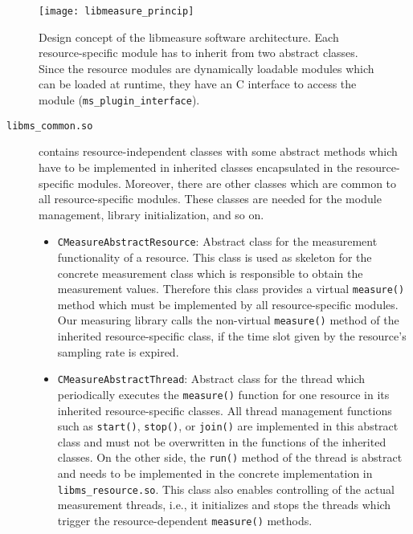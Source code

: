\begin{figure}
\begin{center}
\texttt{[image: libmeasure\_princip]} 
\caption{Design concept of the libmeasure software architecture. Each resource-specific module has to inherit from two abstract classes. Since the resource modules are dynamically loadable modules which can be loaded at runtime, they have an C interface to access the module (\texttt{ms\_plugin\_interface}).}
\label{fig:libmeasure_principle}
\end{center}
\end{figure}

\begin{description}
	
	\item[\texttt{libms\_common.so}] contains resource-independent classes with some abstract methods which have to be implemented in inherited classes encapsulated in the resource-specific modules. Moreover, there are other classes which are common to all resource-specific modules. These classes are needed for the module management, library initialization, and so on.

\pagebreak
\vspace*{-1.0cm}

	\begin{itemize}
		\item \texttt{CMeasureAbstractResource}: Abstract class for the measurement functionality of a resource. This class is used as skeleton for the concrete measurement class which is responsible to obtain the measurement values. Therefore this class provides a virtual \texttt{measure()} method which must be implemented by all resource-specific modules. Our measuring library calls the non-virtual \texttt{measure()} method of the inherited resource-specific class, if the time slot given by the resource's sampling rate is expired.
		
		\item \texttt{CMeasureAbstractThread}: Abstract class for the thread which periodically executes the \texttt{measure()} function for one resource in its inherited resource-specific classes. All thread management functions such as \texttt{start()}, \texttt{stop()}, or \texttt{join()} are implemented in this abstract class and must not be overwritten in the functions of the inherited classes.
		On the other side, the \texttt{run()} method of the thread is abstract and needs to be implemented in the concrete implementation in \texttt{libms\_resource.so}. This class also enables controlling of the actual measurement threads, i.e., it initializes and stops the threads which trigger the resource-dependent \texttt{measure()} methods.
		

\end{itemize}
\end{description}
